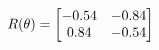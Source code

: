 \documentclass[preview]{standalone}
\begin{document}
\begin{align*}
\special{dvisvgm:raw <g id='unique000'>}R(\theta) = \begin{bmatrix}-0.54 & -0.84\\0.84 & -0.54\end{bmatrix}\special{dvisvgm:raw </g>}
\end{align*}
\end{document}
